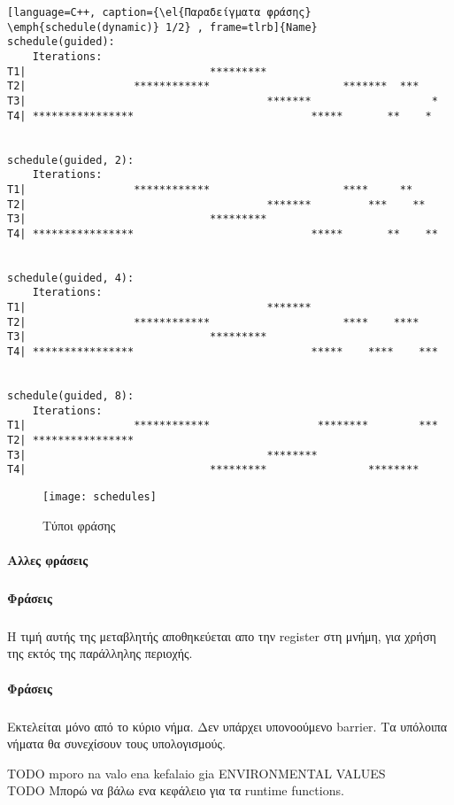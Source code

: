 \begin{lstlisting}[language=C++, caption={\el{Παραδείγματα φράσης} \emph{schedule(dynamic)} 1/2} , frame=tlrb]{Name}
schedule(guided):
    Iterations:       
T1|                             *********                       
T2|                 ************                     *******  ***   
T3|                                      *******                   *
T4| ****************                            *****       **    * 


schedule(guided, 2): 
    Iterations:
T1|                 ************                     ****     **    
T2|                                      *******         ***    **  
T3|                             *********                           
T4| ****************                            *****       **    **


schedule(guided, 4):   
    Iterations:
T1|                                      *******                    
T2|                 ************                     ****    ****   
T3|                             *********                           
T4| ****************                            *****    ****    ***


schedule(guided, 8):   
    Iterations:
T1|                 ************                 ********        ***
T2| ****************                                                
T3|                                      ********                   
T4|                             *********                ********
\end{lstlisting}
     
       
       \begin{figure}[h]
\texttt{[image: schedules]}
\centering
\captionsetup{justification=centering, singlelinecheck=false}
	\caption{Τύποι φράσης }
\label{fig:schedules}
\end{figure}


\paragraph{Αλλες φράσεις}
\subparagraph{}
\paragraph{Φράσεις }
\subparagraph{}
Η τιμή αυτής της μεταβλητής αποθηκεύεται απο την register στη μνήμη, για χρήση της εκτός της παράλληλης περιοχής.
\paragraph{Φράσεις }
\subparagraph{}
      Εκτελείται μόνο από το κύριο νήμα. Δεν υπάρχει υπονοούμενο barrier. Τα υπόλοιπα νήματα θα συνεχίσουν τους υπολογισμούς.

{\Large TODO mporo na valo ena kefalaio gia ENVIRONMENTAL VALUES \\
TODO  Μπορώ να βάλω ενα κεφάλειο για τα runtime functions.}
